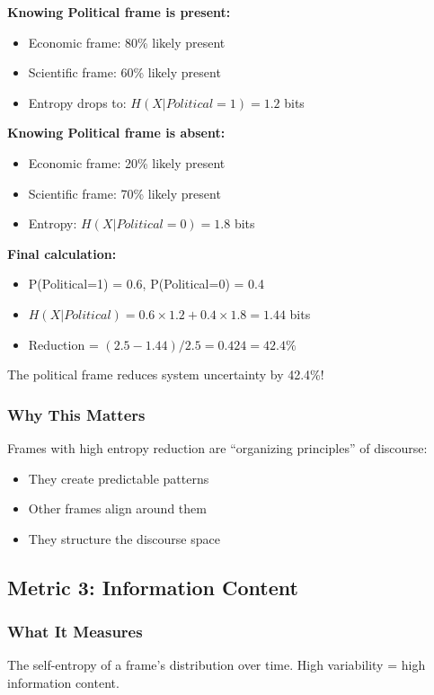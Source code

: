 \documentclass[11pt]{article}
\begin{document}
\textbf{Knowing Political frame is present:}
\begin{itemize}
    \item Economic frame: 80\% likely present
    \item Scientific frame: 60\% likely present
    \item Entropy drops to: $H(X|Political=1) = 1.2$ bits
\end{itemize}

\textbf{Knowing Political frame is absent:}
\begin{itemize}
    \item Economic frame: 20\% likely present
    \item Scientific frame: 70\% likely present
    \item Entropy: $H(X|Political=0) = 1.8$ bits
\end{itemize}

\textbf{Final calculation:}
\begin{itemize}
    \item P(Political=1) = 0.6, P(Political=0) = 0.4
    \item $H(X|Political) = 0.6 \times 1.2 + 0.4 \times 1.8 = 1.44$ bits
    \item Reduction = $(2.5 - 1.44) / 2.5 = 0.424 = 42.4\%$
\end{itemize}

The political frame reduces system uncertainty by 42.4\%!

\subsubsection{Why This Matters}

Frames with high entropy reduction are ``organizing principles'' of discourse:
\begin{itemize}
    \item They create predictable patterns
    \item Other frames align around them
    \item They structure the discourse space
\end{itemize}

\subsection{Metric 3: Information Content}

\subsubsection{What It Measures}
The self-entropy of a frame's distribution over time. High variability = high information content.
\end{document}
